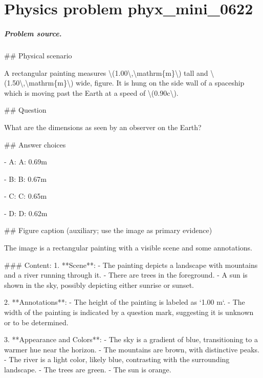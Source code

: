 
\chapter{Physics problem phyx\_mini\_0622}
\label{ch:PhyXMiniProblems_problem_phyx_mini_0622}

\paragraph{Problem source.}
\#\# Physical scenario

A rectangular painting measures \textbackslash{}(1.00\textbackslash{},\textbackslash{}mathrm\{m\}\textbackslash{}) tall and \textbackslash{}(1.50\textbackslash{},\textbackslash{}mathrm\{m\}\textbackslash{}) wide, figure. It is hung on the side wall of a spaceship which is moving past the Earth at a speed of \textbackslash{}(0.90c\textbackslash{}).

\#\# Question

What are the dimensions as seen by an observer on the Earth?

\#\# Answer choices

- A: A: 0.69m

- B: B: 0.67m

- C: C: 0.65m

- D: D: 0.62m

\#\# Figure caption (auxiliary; use the image as primary evidence)

The image is a rectangular painting with a visible scene and some annotations. 

\#\#\# Content:
1. **Scene**:
   - The painting depicts a landscape with mountains and a river running through it.
   - There are trees in the foreground.
   - A sun is shown in the sky, possibly depicting either sunrise or sunset.

2. **Annotations**:
   - The height of the painting is labeled as `1.00 m`.
   - The width of the painting is indicated by a question mark, suggesting it is unknown or to be determined.

3. **Appearance and Colors**:
   - The sky is a gradient of blue, transitioning to a warmer hue near the horizon.
   - The mountains are brown, with distinctive peaks.
   - The river is a light color, likely blue, contrasting with the surrounding landscape.
   - The trees are green.
   - The sun is orange.

